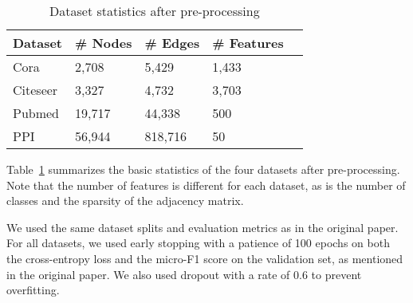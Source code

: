 \begin{table}
    \centering
    \begin{tabular}{@{}lllll@{}}
        \toprule
        \textbf{Dataset} & \textbf{\# Nodes} & \textbf{\# Edges} & \textbf{\# Features} \\
        \midrule
        Cora & 2,708 & 5,429 & 1,433 \\
        Citeseer & 3,327 & 4,732 & 3,703 \\
        Pubmed & 19,717 & 44,338 & 500 \\
        PPI & 56,944 & 818,716 & 50 \\
        \bottomrule
    \end{tabular}
    \caption{Dataset statistics after pre-processing}
    \label{tab:dataset_stats}

\end{table}


Table~\ref{tab:dataset_stats} summarizes the basic statistics of the four datasets after pre-processing.
Note that the number of features is different for each dataset, as is the number of classes and the sparsity of the adjacency matrix.


We used the same dataset splits and evaluation metrics as in the original paper.
For all datasets, we used early stopping with a patience of 100 epochs on both the cross-entropy loss and the micro-F1 score on the validation set, as mentioned in the original paper.
We also used dropout with a rate of 0.6 to prevent overfitting.
